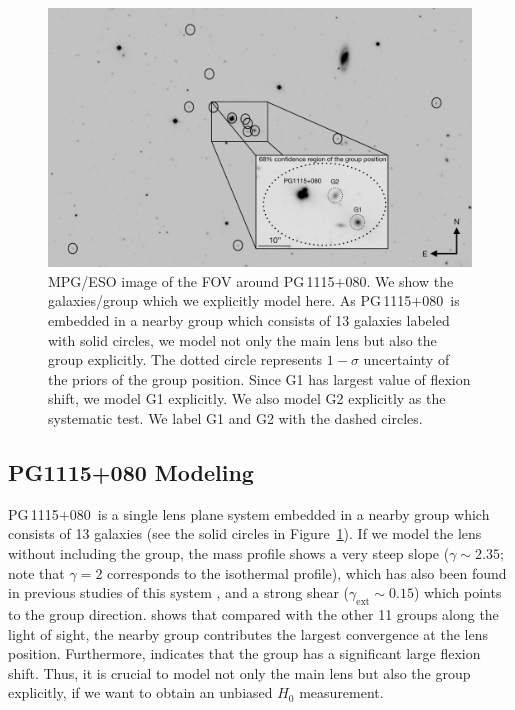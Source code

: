 \documentclass[useAMS,usenatbib]{mnras}
\newcommand\pg{PG\,1115$+$080}
\newcommand{\fref}[1]{Figure~\ref{#1}}
\begin{document}
\begin{figure}
\centering
\includegraphics[width=\linewidth]{PG1115_envi8.png}
\caption{
MPG/ESO image of the FOV around \pg . We show the galaxies/group which we explicitly model here. As \pg~is embedded in a nearby group which consists of 13 galaxies labeled with solid circles, we model not only the main lens but also the group explicitly. The dotted circle represents $1-\sigma$ uncertainty of the priors of the group position. Since G1 has largest value of flexion shift, we model G1 explicitly. We also model G2 explicitly as the systematic test. We label G1 and G2 with the dashed circles.}
\label{fig:PG1115_envir}
\end{figure}

\subsection{PG1115+080 Modeling}
\label{subsec:PGmodeling}
\pg~is a single lens plane system embedded in a nearby group which consists of 13 galaxies (see the solid circles in \fref{fig:PG1115_envir}). If we model the lens without including the group, the mass profile shows a very steep slope ($\gamma\sim2.35$; note that $\gamma=2$ corresponds to the isothermal profile), which has also been found in previous studies of this system \citep[e.g.,][]{TreuKoopmans02}, and a strong shear ($\gamma_{
\textrm{ext}}\sim0.15$) which points to the group direction. 
\citet{WilsonEtal16} shows that compared with the other 11 groups along the light of sight, the nearby group contributes the largest convergence at the lens position. 
Furthermore, \cite{McCullyEtal17} indicates that the group has a significant large flexion shift. 
Thus, it is crucial to model not only the main lens but also the group explicitly, if we want to obtain an unbiased $H_{0}$ measurement.
\end{document}
